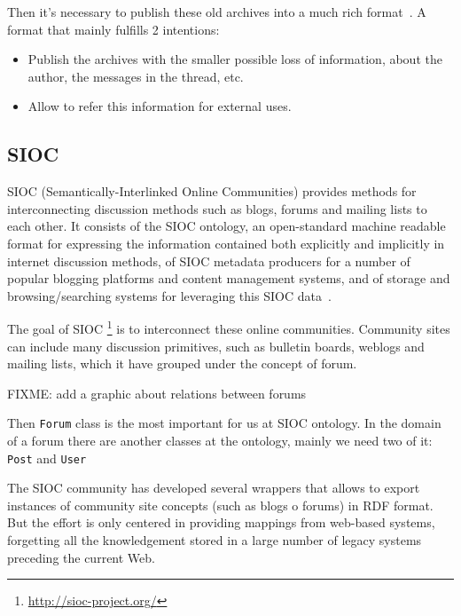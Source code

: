 \documentclass{llncs}
\begin{document}
Then it's necessary to publish these old archives into a much rich format~\cite{Luke2004}.
A format that mainly fulfills 2 intentions:
\begin{itemize}
  \item Publish the archives with the smaller possible loss of information,
	about the author, the messages in the thread, etc.
  \item Allow to refer this information for external uses.
\end{itemize}

\subsection{SIOC}

SIOC (Semantically-Interlinked Online Communities) provides methods for 
interconnecting discussion methods such as blogs, forums and mailing lists 
to each other. It consists of the SIOC ontology, an open-standard machine 
readable format for expressing the information contained both explicitly 
and implicitly in internet discussion methods, of SIOC metadata producers 
for a number of popular blogging platforms and content management systems, 
and of storage and browsing/searching systems for leveraging this SIOC 
data~\cite{Breslin2005}.

The goal of SIOC \footnote{\url{http://sioc-project.org/}} is to interconnect
these online communities. Community sites can include many discussion primitives,
such as bulletin boards, weblogs and mailing lists, which it have grouped under 
the concept of forum.


FIXME: add a graphic about relations between forums

Then \texttt{Forum} class is the most important for us at SIOC ontology. In the 
domain of a forum there are another classes at the ontology, mainly we need two
of it: \texttt{Post} and \texttt{User} 

The SIOC community has developed several wrappers that allows to export instances
of community site concepts (such as blogs o forums) in RDF format. But the effort 
is only centered in providing mappings from web-based systems, forgetting all the 
knowledgement stored in a large number of legacy systems preceding the current Web.
\end{document}
